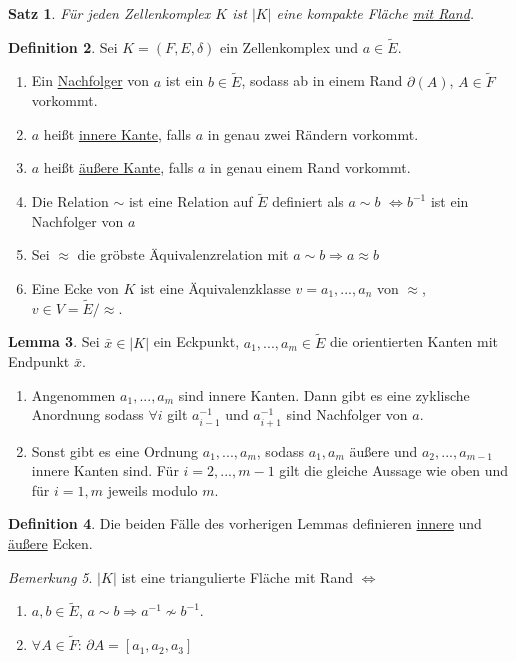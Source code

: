 \documentclass[a4paper, 12pt]{article}
\theoremstyle{plain}
\newtheorem{theorem}{Satz}[section] %
\theoremstyle{definition}
\newtheorem{definition}[theorem]{Definition} %
\theoremstyle{lemma}
\newtheorem{lemma}[theorem]{Lemma}
\theoremstyle{remark}
\newtheorem{remark}[theorem]{Bemerkung}
\theoremstyle{corollary}
\theoremstyle{example}
\begin{document}
	\begin{theorem}
		Für jeden Zellenkomplex $K$ ist $\left|K\right|$ eine kompakte Fläche \underline{mit Rand}. 
	\end{theorem}
	\begin{definition}
		Sei $K = (F,E,\delta)$ ein Zellenkomplex und $a \in \tilde{E}$. \begin{enumerate}
			\item Ein \underline{Nachfolger} von $a$ ist ein $b \in \tilde{E}$, sodass ab in einem Rand $\partial(A)$, $A \in \tilde{F}$ vorkommt.
			\item $a$ heißt \underline{innere Kante}, falls $a$ in genau zwei Rändern vorkommt.
			\item $a$ heißt \underline{äußere Kante}, falls $a$ in genau einem Rand vorkommt.
			\item Die Relation $\sim$ ist eine Relation auf $\tilde{E}$ definiert als $a\sim b$ $\Leftrightarrow b^{-1}$ ist ein Nachfolger von $a$
			\item Sei $\approx$ die gröbste Äquivalenzrelation mit $a \sim b \Rightarrow a \approx b$
			\item Eine Ecke von $K$ ist eine Äquivalenzklasse $v = {a_1,...,a_n}$ von $\approx$, $v \in V = \tilde{E}/\approx$.
		\end{enumerate}
	\end{definition}
	\begin{lemma}
		Sei $\bar{x} \in \left|K\right|$ ein Eckpunkt, $a_1,...,a_m \in \tilde{E}$ die orientierten Kanten mit Endpunkt $\bar{x}$. \begin{enumerate}
			\item Angenommen $a_1,...,a_m$ sind innere Kanten. Dann gibt es eine zyklische Anordnung sodass $\forall i$ gilt $a_{i-1}^{-1}$ und $a_{i+1}^{-1}$ sind Nachfolger von $a$. 
			\item Sonst gibt es eine Ordnung $a_1,...,a_m$, sodass $a_1, a_m$ äußere und $a_2,...,a_{m-1}$ innere Kanten sind. Für $i=2,...,m-1$ gilt die gleiche Aussage wie oben und für $i=1,m$ jeweils modulo $m$.
		\end{enumerate}
	\end{lemma}
	\begin{definition}
		Die beiden Fälle des vorherigen Lemmas definieren \underline{innere} und \underline{äußere} Ecken.
	\end{definition}
	\begin{remark}
		$\left|K\right|$ ist eine triangulierte Fläche mit Rand $\Leftrightarrow$
		\begin{enumerate}
			\item $a,b \in \tilde{E}$, $a \sim b \Rightarrow a^{-1} \not \sim b^{-1}$.
			\item $\forall A \in \tilde{F}$: $\partial A = [a_1,a_2,a_3]$ 
		\end{enumerate}
	\end{remark}
\end{document}
